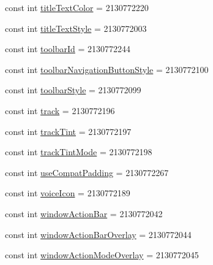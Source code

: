 \begin{DoxyCompactItemize}
\item 
const int \mbox{\hyperlink{class_f_w_p_s___app_1_1_droid_1_1_resource_1_1_attribute_a82949703c1d75c0a7943dc4f6fe1e3d4}{title\+Text\+Color}} = 2130772220
\item 
const int \mbox{\hyperlink{class_f_w_p_s___app_1_1_droid_1_1_resource_1_1_attribute_a5138ee4fbd71efad5cf04a9ce19a4de7}{title\+Text\+Style}} = 2130772003
\item 
const int \mbox{\hyperlink{class_f_w_p_s___app_1_1_droid_1_1_resource_1_1_attribute_ae216dc8d0ab52bd8617dd196b0ca5319}{toolbar\+Id}} = 2130772244
\item 
const int \mbox{\hyperlink{class_f_w_p_s___app_1_1_droid_1_1_resource_1_1_attribute_a23027e52cd828db8803643b6f7e44045}{toolbar\+Navigation\+Button\+Style}} = 2130772100
\item 
const int \mbox{\hyperlink{class_f_w_p_s___app_1_1_droid_1_1_resource_1_1_attribute_a73151d9997ec9c5b4164cc744c27d203}{toolbar\+Style}} = 2130772099
\item 
const int \mbox{\hyperlink{class_f_w_p_s___app_1_1_droid_1_1_resource_1_1_attribute_adc88e2d722d5f9829615a8598ba03148}{track}} = 2130772196
\item 
const int \mbox{\hyperlink{class_f_w_p_s___app_1_1_droid_1_1_resource_1_1_attribute_a3ee5a302f4ac32e9054af99a10ad332b}{track\+Tint}} = 2130772197
\item 
const int \mbox{\hyperlink{class_f_w_p_s___app_1_1_droid_1_1_resource_1_1_attribute_a7d37ee3d5b8467216d227bf6477eb421}{track\+Tint\+Mode}} = 2130772198
\item 
const int \mbox{\hyperlink{class_f_w_p_s___app_1_1_droid_1_1_resource_1_1_attribute_ad0ba3dbc096901c30cc1edf9177080fb}{use\+Compat\+Padding}} = 2130772267
\item 
const int \mbox{\hyperlink{class_f_w_p_s___app_1_1_droid_1_1_resource_1_1_attribute_a7552dc135f8eac1b27a0ccba084580d6}{voice\+Icon}} = 2130772189
\item 
const int \mbox{\hyperlink{class_f_w_p_s___app_1_1_droid_1_1_resource_1_1_attribute_a3a34b9cee276f048138bb51ce9be5268}{window\+Action\+Bar}} = 2130772042
\item 
const int \mbox{\hyperlink{class_f_w_p_s___app_1_1_droid_1_1_resource_1_1_attribute_a5ac798436751e1eb705fc803a57efe9a}{window\+Action\+Bar\+Overlay}} = 2130772044
\item 
const int \mbox{\hyperlink{class_f_w_p_s___app_1_1_droid_1_1_resource_1_1_attribute_a9d42abfdbb241612d42ec02b52829a4c}{window\+Action\+Mode\+Overlay}} = 2130772045

\end{DoxyCompactItemize}
